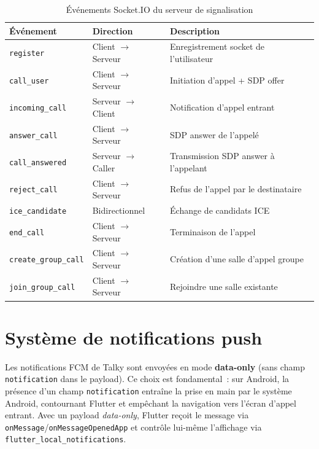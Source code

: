 \documentclass[12pt,a4paper]{report}
\begin{document}
\begin{table}[H]
\centering
\caption{Événements Socket.IO du serveur de signalisation}
\label{tab:socket}
\renewcommand{\arraystretch}{1.3}
\begin{tabularx}{\textwidth}{@{}llX@{}}
\toprule
\textbf{Événement} & \textbf{Direction} & \textbf{Description}\\\midrule
\texttt{register}         & Client $\to$ Serveur & Enregistrement socket de l'utilisateur\\
\texttt{call\_user}       & Client $\to$ Serveur & Initiation d'appel + SDP offer\\
\texttt{incoming\_call}   & Serveur $\to$ Client & Notification d'appel entrant\\
\texttt{answer\_call}     & Client $\to$ Serveur & SDP answer de l'appelé\\
\texttt{call\_answered}   & Serveur $\to$ Caller & Transmission SDP answer à l'appelant\\
\texttt{reject\_call}     & Client $\to$ Serveur & Refus de l'appel par le destinataire\\
\texttt{ice\_candidate}   & Bidirectionnel       & Échange de candidats ICE\\
\texttt{end\_call}        & Client $\to$ Serveur & Terminaison de l'appel\\
\texttt{create\_group\_call} & Client $\to$ Serveur & Création d'une salle d'appel groupe\\
\texttt{join\_group\_call}   & Client $\to$ Serveur & Rejoindre une salle existante\\
\bottomrule
\end{tabularx}
\end{table}

\section{Système de notifications push}

\begin{warningbox}
Les notifications FCM de Talky sont envoyées en mode \textbf{data-only} (sans champ \texttt{notification} dans le payload). Ce choix est fondamental~: sur Android, la présence d'un champ \texttt{notification} entraîne la prise en main par le système Android, contournant Flutter et empêchant la navigation vers l'écran d'appel entrant. Avec un payload \textit{data-only}, Flutter reçoit le message via \texttt{onMessage}/\texttt{onMessageOpenedApp} et contrôle lui-même l'affichage via \texttt{flutter\_local\_notifications}.
\end{warningbox}
\end{document}
